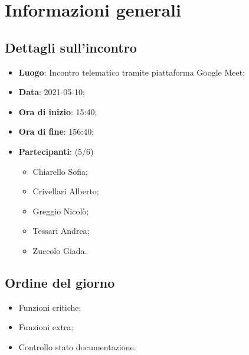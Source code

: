 \section{Informazioni generali}

\subsection{Dettagli sull'incontro}
\begin{itemize}
\item \textbf{Luogo}: Incontro telematico tramite piattaforma Google Meet;
\item \textbf{Data}: 2021-05-10;
\item \textbf{Ora di inizio}: 15:40;
\item \textbf{Ora di fine}: 156:40;
\item \textbf{Partecipanti}: (5/6) 
\begin{itemize}
	\item Chiarello Sofia;
	\item Crivellari Alberto;
	\item Greggio Nicolò;
	\item Tessari Andrea;
	\item Zuccolo Giada.
\end{itemize}
\end{itemize}

\subsection{Ordine del giorno}
\begin{itemize}
	\item Funzioni critiche;
	\item Funzioni extra;
	\item Controllo stato documentazione.
\end{itemize}


